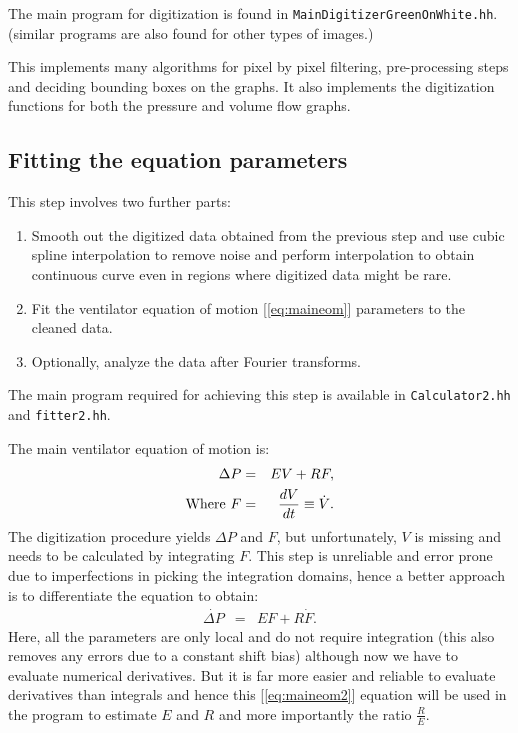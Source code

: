 	\begin{center}
		The main program for digitization is found in {\tt{MainDigitizerGreenOnWhite.hh}}.\\
		(similar programs are also found for other types of images.)
	\end{center}
	This implements many algorithms for pixel by pixel filtering, pre-processing steps and deciding bounding boxes on the graphs.
	It also implements the digitization functions for both the pressure and volume flow graphs.
	
	\subsection{Fitting the equation parameters}
	This step involves two further parts:
	\begin{enumerate}
		\item
		Smooth out the digitized data obtained from the previous step and use cubic spline interpolation to remove noise and perform interpolation to obtain continuous curve even in regions where digitized data might be rare.
		
		\item
		Fit the ventilator equation of motion [\autoref{eq:maineom}] parameters to the cleaned data.
		
		\item
		Optionally, analyze the data after Fourier transforms.
	\end{enumerate}
	\begin{center}
		The main program required for achieving this step is available in {\tt{Calculator2.hh}} and {\tt{fitter2.hh}}.
	\end{center}

	The main ventilator equation of motion is:
	\begin{eqnarray}
		\Delta P & = & EV+RF \label{eq:maineom},\\
		\text{Where }F & = & \frac{dV}{dt}\equiv\dot{V} {\nonumber}.
	\end{eqnarray}
	The digitization procedure yields $\Delta P$ and $F$, but unfortunately, $V$ is missing and needs to be calculated by integrating $F$.
	This step is unreliable and error prone due to imperfections in picking the integration domains, hence a better approach is to differentiate the equation to obtain:
	\begin{eqnarray}
		\dot{\Delta P} & = & EF+R\dot{F} \label{eq:maineom2}.
	\end{eqnarray}
	Here, all the parameters are only local and do not require integration (this also removes any errors due to a constant shift bias) although now we have to evaluate numerical derivatives.
	But it is far more easier and reliable to evaluate derivatives than integrals and hence this [\autoref{eq:maineom2}] equation will be used in the program to estimate $E$ and $R$ and more importantly the ratio $\frac{R}{E}$.
	
